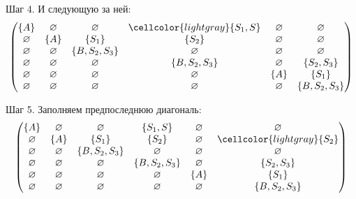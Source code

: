 \begin{example}
    Шаг 4.
    И следующую за ней:
    \[
        \begin{pmatrix}
            \{A\}       & \varnothing & \varnothing     & \cellcolor{lightgray}\{S_1, S\} & \varnothing & \varnothing     \\
            \varnothing & \{A\}       & \{S_1\}         & \{S_2\}                         & \varnothing & \varnothing     \\
            \varnothing & \varnothing & \{B, S_2, S_3\} & \varnothing                     & \varnothing & \varnothing     \\
            \varnothing & \varnothing & \varnothing     & \{B, S_2, S_3\}                 & \varnothing & \{S_2, S_3\}    \\
            \varnothing & \varnothing & \varnothing     & \varnothing                     & \{A\}       & \{S_1\}         \\
            \varnothing & \varnothing & \varnothing     & \varnothing                     & \varnothing & \{B, S_2, S_3\}
        \end{pmatrix}
    \]

    Шаг 5.
    Заполняем предпоследнюю диагональ:
    \[
        \begin{pmatrix}
            \{A\}       & \varnothing & \varnothing     & \{S_1, S\}      & \varnothing & \varnothing                  \\
            \varnothing & \{A\}       & \{S_1\}         & \{S_2\}         & \varnothing & \cellcolor{lightgray}\{S_2\} \\
            \varnothing & \varnothing & \{B, S_2, S_3\} & \varnothing     & \varnothing & \varnothing                  \\
            \varnothing & \varnothing & \varnothing     & \{B, S_2, S_3\} & \varnothing & \{S_2, S_3\}                 \\
            \varnothing & \varnothing & \varnothing     & \varnothing     & \{A\}       & \{S_1\}                      \\
            \varnothing & \varnothing & \varnothing     & \varnothing     & \varnothing & \{B, S_2, S_3\}
        \end{pmatrix}
    \]


\end{example}
